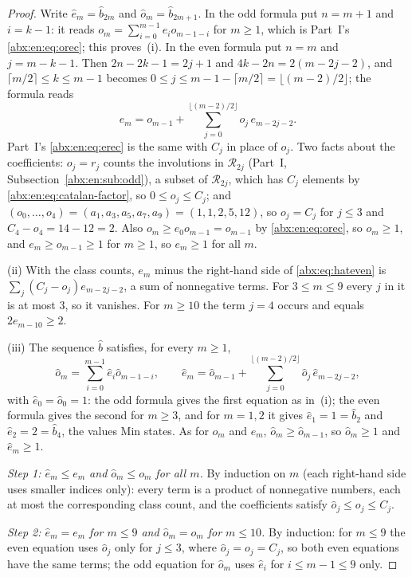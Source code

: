 \documentclass[11pt,letterpaper]{article}
\numberwithin{equation}{section}
\theoremstyle{remark}\newtheorem{remark}[theorem]{Remark}
\newcommand{\RR}{\mathcal R}
\begin{document}
\begin{proof}
Write $\hat e_m=\hat b_{2m}$ and $\hat o_m=\hat b_{2m+1}$. In the odd formula put $n=m+1$ and $i=k-1$: it reads $o_m=\sum_{i=0}^{m-1}e_io_{m-1-i}$ for $m\ge1$, which is Part~I's \eqref{abx:en:eq:orec}; this proves~(i). In the even formula put $n=m$ and $j=m-k-1$. Then $2n-2k-1=2j+1$ and $4k-2n=2(m-2j-2)$, and $\lceil m/2\rceil\le k\le m-1$ becomes $0\le j\le m-1-\lceil m/2\rceil=\lfloor(m-2)/2\rfloor$; the formula reads
\begin{equation}\label{abx:eq:hateven}
 e_m=o_{m-1}+\sum_{j=0}^{\lfloor(m-2)/2\rfloor}o_j\,e_{m-2j-2}.
\end{equation}
Part~I's \eqref{abx:en:eq:erec} is the same with $C_j$ in place of $o_j$. Two facts about the coefficients: $o_j=r_j$ counts the involutions in $\RR_{2j}$ (Part~I, Subsection~\ref{abx:en:sub:odd}), a subset of $\RR_{2j}$, which has $C_j$ elements by \eqref{abx:en:eq:catalan-factor}, so $0\le o_j\le C_j$; and $(o_0,\ldots,o_4)=(a_1,a_3,a_5,a_7,a_9)=(1,1,2,5,12)$, so $o_j=C_j$ for $j\le3$ and $C_4-o_4=14-12=2$. Also $o_m\ge e_0o_{m-1}=o_{m-1}$ by \eqref{abx:en:eq:orec}, so $o_m\ge1$, and $e_m\ge o_{m-1}\ge1$ for $m\ge1$, so $e_m\ge1$ for all $m$.

(ii) With the class counts, $e_m$ minus the right-hand side of \eqref{abx:eq:hateven} is $\sum_j(C_j-o_j)e_{m-2j-2}$, a sum of nonnegative terms. For $3\le m\le9$ every $j$ in it is at most $3$, so it vanishes. For $m\ge10$ the term $j=4$ occurs and equals $2e_{m-10}\ge2$.

(iii) The sequence $\hat b$ satisfies, for every $m\ge1$,
\[
 \hat o_m=\sum_{i=0}^{m-1}\hat e_i\hat o_{m-1-i},\qquad
 \hat e_m=\hat o_{m-1}+\sum_{j=0}^{\lfloor(m-2)/2\rfloor}\hat o_j\,\hat e_{m-2j-2},
\]
with $\hat e_0=\hat o_0=1$: the odd formula gives the first equation as in~(i); the even formula gives the second for $m\ge3$, and for $m=1,2$ it gives $\hat e_1=1=\hat b_2$ and $\hat e_2=2=\hat b_4$, the values Min states. As for $o_m$ and $e_m$, $\hat o_m\ge\hat o_{m-1}$, so $\hat o_m\ge1$ and $\hat e_m\ge1$.

\emph{Step 1: $\hat e_m\le e_m$ and $\hat o_m\le o_m$ for all $m$.} By induction on $m$ (each right-hand side uses smaller indices only): every term is a product of nonnegative numbers, each at most the corresponding class count, and the coefficients satisfy $\hat o_j\le o_j\le C_j$.

\emph{Step 2: $\hat e_m=e_m$ for $m\le9$ and $\hat o_m=o_m$ for $m\le10$.} By induction: for $m\le9$ the even equation uses $\hat o_j$ only for $j\le3$, where $\hat o_j=o_j=C_j$, so both even equations have the same terms; the odd equation for $\hat o_m$ uses $\hat e_i$ for $i\le m-1\le9$ only.


\end{proof}
\end{document}
